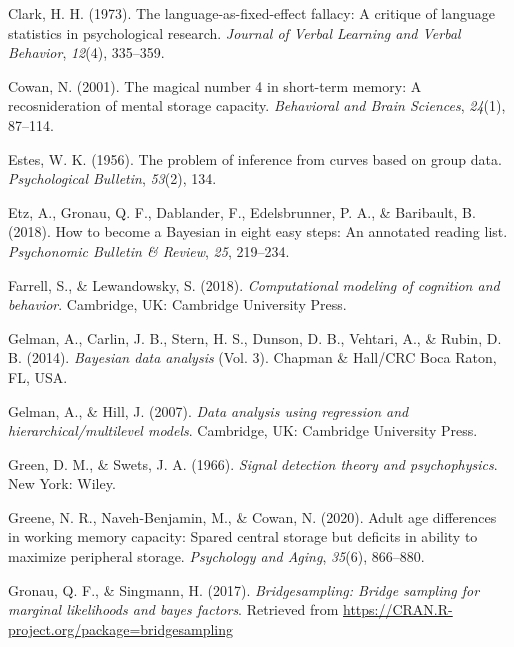 \documentclass[
  english,
  ,man,floatsintext]{apa6}
\begin{document}
\leavevmode\hypertarget{ref-clark1973language}{}%
Clark, H. H. (1973). The language-as-fixed-effect fallacy: A critique of language statistics in psychological research. \emph{Journal of Verbal Learning and Verbal Behavior}, \emph{12}(4), 335--359.

\leavevmode\hypertarget{ref-Cowan2001}{}%
Cowan, N. (2001). The magical number 4 in short-term memory: A recosnideration of mental storage capacity. \emph{Behavioral and Brain Sciences}, \emph{24}(1), 87--114.

\leavevmode\hypertarget{ref-estes1956problem}{}%
Estes, W. K. (1956). The problem of inference from curves based on group data. \emph{Psychological Bulletin}, \emph{53}(2), 134.

\leavevmode\hypertarget{ref-EtzEtAl2018}{}%
Etz, A., Gronau, Q. F., Dablander, F., Edelsbrunner, P. A., \& Baribault, B. (2018). How to become a Bayesian in eight easy steps: An annotated reading list. \emph{Psychonomic Bulletin \& Review}, \emph{25}, 219--234.

\leavevmode\hypertarget{ref-FarrellAndLewandowsky2018}{}%
Farrell, S., \& Lewandowsky, S. (2018). \emph{Computational modeling of cognition and behavior}. Cambridge, UK: Cambridge University Press.

\leavevmode\hypertarget{ref-GelmanEtAl2014}{}%
Gelman, A., Carlin, J. B., Stern, H. S., Dunson, D. B., Vehtari, A., \& Rubin, D. B. (2014). \emph{Bayesian data analysis} (Vol. 3). Chapman \& Hall/CRC Boca Raton, FL, USA.

\leavevmode\hypertarget{ref-GelmanAndHill2007}{}%
Gelman, A., \& Hill, J. (2007). \emph{Data analysis using regression and hierarchical/multilevel models}. Cambridge, UK: Cambridge University Press.

\leavevmode\hypertarget{ref-GreenAndSwets1966}{}%
Green, D. M., \& Swets, J. A. (1966). \emph{Signal detection theory and psychophysics}. New York: Wiley.

\leavevmode\hypertarget{ref-GreeneEtAl2020}{}%
Greene, N. R., Naveh-Benjamin, M., \& Cowan, N. (2020). Adult age differences in working memory capacity: Spared central storage but deficits in ability to maximize peripheral storage. \emph{Psychology and Aging}, \emph{35}(6), 866--880.

\leavevmode\hypertarget{ref-bridgesampling}{}%
Gronau, Q. F., \& Singmann, H. (2017). \emph{Bridgesampling: Bridge sampling for marginal likelihoods and bayes factors}. Retrieved from \url{https://CRAN.R-project.org/package=bridgesampling}
\end{document}
